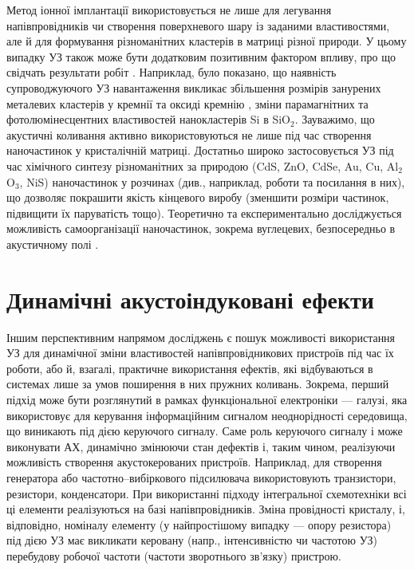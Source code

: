 Метод іонної імплантації використовується не лише для легування напівпровідників чи створення поверхневого шару із заданими властивостями, але й для формування різноманітних кластерів в матриці різної природи.
У цьому випадку УЗ також може бути додатковим позитивним фактором впливу, про що свідчать результати робіт \cite{Roman:2006JAP,Roman:2007APL,Roman:2010JAP,YOlikh2010JL}.
Наприклад, було показано, що наявність супроводжуючого УЗ навантаження викликає збільшення розмірів занурених металевих кластерів у кремнії \cite{Roman:2006JAP} та оксиді кремнію \cite{Roman:2007APL}, зміни парамагнітних \cite{Roman:2010JAP} та фотолюмінесцентних \cite{YOlikh2010JL} властивостей нанокластерів Si в SiO$_2$.
Зауважимо, що акустичні коливання активно використовуються не лише під час створення наночастинок у кристалічній матриці.
Достатньо широко застосовується УЗ під час хімічного синтезу різноманітних за природою (CdS, ZnO, CdSe, Au, Cu, Al$_2$O$_3$, NiS) наночастинок у розчинах (див., наприклад, роботи \cite{US:nanoParticle,US:nanoCdSe,US:nanoCu,US:nanoCdS,US:nanoCdSNiS,US:nanoZnOAu} та посилання в них),
що дозволяє покрашити якість кінцевого виробу (зменшити розміри частинок, підвищити їх паруватість тощо).
Теоретично та експериментально досліджується можливість самоорганізації наночастинок, зокрема вуглецевих, безпосередньо в акустичному полі  \cite{US:nanoAPL2016,PhysRevLett106:076102}.



\section{Динамічні акустоіндуковані ефекти}

Іншим перспективним напрямом досліджень є пошук можливості використання УЗ для динамічної зміни властивостей напівпровідникових пристроїв під час їх роботи,
або й, взагалі, практичне використання ефектів, які відбуваються в системах лише за умов поширення в них пружних коливань.
Зокрема, перший підхід може бути розглянутий в рамках функціональної електроніки --- галузі,
яка використовує для керування інформаційним сигналом неоднорідності середовища,  що виникають під дією керуючого сигналу.
Саме роль керуючого сигналу і може виконувати АХ, динамічно змінюючи стан дефектів і, таким чином, реалізуючи можливість створення акустокерованих пристроїв.
Наприклад, для створення генератора або частотно--вибіркового підсилювача використовують транзистори, резистори, конденсатори.
При використанні підходу інтегральної схемотехніки всі ці елементи реалізуються на базі напівпровідників.
Зміна провідності кристалу, і, відповідно, номіналу елементу (у найпростішому випадку --- опору резистора) під дією УЗ
має викликати керовану (напр., інтенсивністю чи частотою УЗ) перебудову робочої частоти (частоти зворотнього зв'язку) пристрою.

